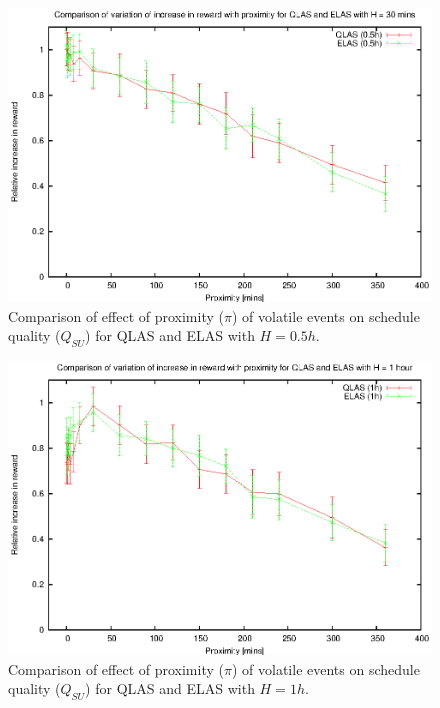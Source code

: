 
\begin{figure}[htbp]
\begin{center}
    \includegraphics[scale=1.0, angle=0]{figures/evplot_05.eps}
\end{center}
\caption[Comparison of effect of proximity ($\pi$) of volatile events on schedule quality ($Q_{SU}$) for QLAS and ELAS ($H = 0.5h$).]
{Comparison of effect of proximity ($\pi$) of volatile events on schedule quality ($Q_{SU}$) for QLAS and ELAS with $H = 0.5h$.}
\label{fig:vol_qe05_pi}
\end{figure}

\begin{figure}[htbp]
\begin{center}
    \includegraphics[scale=1.0, angle=0]{figures/evplot_1.eps}
\end{center}
\caption[Comparison of effect of proximity ($\pi$) of volatile events on schedule quality ($Q_{SU}$) for QLAS and ELAS ($H = 1h$).]
{Comparison of effect of proximity ($\pi$) of volatile events on schedule quality ($Q_{SU}$) for QLAS and ELAS with $H = 1h$.}
\label{fig:vol_qe1_pi}
\end{figure}

